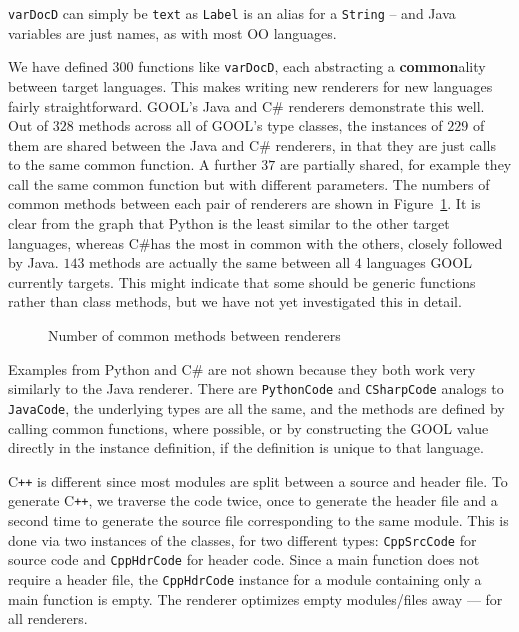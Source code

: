 \documentclass[sigplan,review,anonymous,prologue,dvipsnames]{acmart}
\newcommand{\Csharp}{C\#}
\newcommand{\Cplusplus}{C\texttt{++}}
\newcommand{\abbrev}[1]{\textbf{#1}}
\newcommand{\common}{\abbrev{common}}
\begin{document}
\verb|varDocD| can simply be \verb|text| as \verb|Label| is an
alias for a \verb|String| -- and Java variables are just names,
as with most OO languages.

We have defined $300$ functions like \verb|varDocD|, each abstracting a 
\common ality between target languages. This
makes writing new renderers for new languages fairly straightforward.
GOOL's Java and \Csharp{} renderers demonstrate this well. Out of $328$
methods across all of GOOL's type classes, the instances of $229$ of them are
shared between the Java and \Csharp{} renderers, in that they are just calls to 
the same common function. A further $37$ are partially shared, for example they 
call the same common function but with different parameters. The numbers of 
common methods between each pair of renderers are shown in 
Figure~\ref{fig:common}. It is clear from the graph that Python is the least 
similar to the other target languages, whereas \Csharp has the most in common 
with the others, closely followed by Java. $143$ methods are
actually the same between all $4$ languages GOOL currently targets. This might
indicate that some should be generic functions rather than class methods,
but we have not yet investigated this in detail.
\begin{figure}[!h]
\caption{Number of common methods between renderers}
\label{fig:common}
\end{figure}

Examples from Python and \Csharp{} are not shown because they both
work very similarly to the Java renderer. There are \verb|PythonCode| and
\verb|CSharpCode| analogs to \verb|JavaCode|, the underlying types are all the
same, and the methods are defined by calling common functions, where possible,
or by constructing the GOOL value directly in the instance definition, if the
definition is unique to that language.

\Cplusplus{} is different since most modules are split between a source and
header file. To generate \Cplusplus, we traverse the code twice,
once to generate the header file and a second time to generate the
source file corresponding to the same module. This is done via two instances
of the classes, for two different types: \verb|CppSrcCode| for source code and
\verb|CppHdrCode| for header code. Since a main function does not require a
header file, the \verb|CppHdrCode| instance for a module containing only a main
function is empty. The renderer optimizes empty modules/files away --- for
all renderers.
\end{document}
